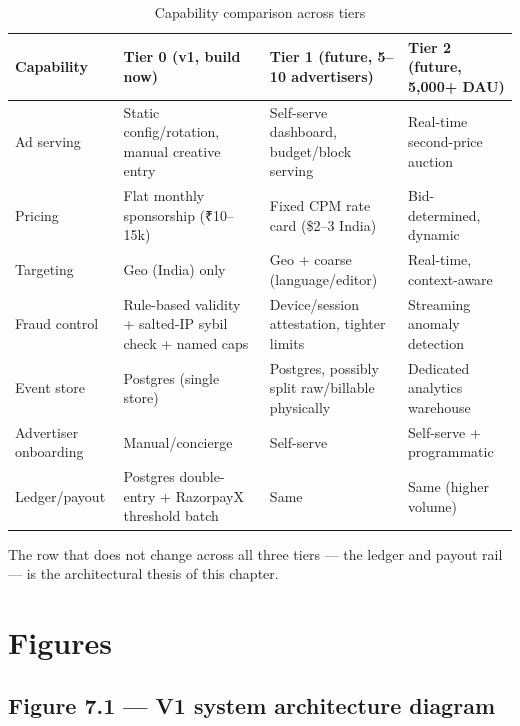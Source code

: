 \begin{table}[htbp]
\centering
\caption{Capability comparison across tiers}
\label{tab:tier-summary}
\small
\begin{tabular}{p{} p{} p{} p{}}
\toprule
\textbf{Capability} & \textbf{Tier 0 (v1, build now)} & \textbf{Tier 1 (future, 5--10 advertisers)} & \textbf{Tier 2 (future, 5,000+ DAU)} \\
\midrule
Ad serving & Static config/rotation, manual creative entry & Self-serve dashboard, budget/block serving & Real-time second-price auction \\
Pricing & Flat monthly sponsorship (₹10--15k) & Fixed CPM rate card (\$2--3 India) & Bid-determined, dynamic \\
Targeting & Geo (India) only & Geo + coarse (language/editor) & Real-time, context-aware \\
Fraud control & Rule-based validity + salted-IP sybil check + named caps & Device/session attestation, tighter limits & Streaming anomaly detection \\
Event store & Postgres (single store) & Postgres, possibly split raw/billable physically & Dedicated analytics warehouse \\
Advertiser onboarding & Manual/concierge & Self-serve & Self-serve + programmatic \\
Ledger/payout & Postgres double-entry + RazorpayX threshold batch & Same & Same (higher volume) \\
\bottomrule
\end{tabular}
\end{table}

The row that does not change across all three tiers --- the ledger and payout rail --- is the architectural thesis of this chapter.

\section{Figures}
\label{sec:figures}

\subsection{Figure 7.1 --- V1 system architecture diagram}

